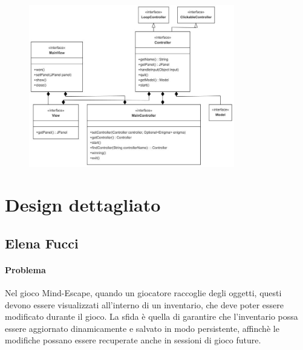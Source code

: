 \documentclass[a4paper,12pt]{report}
\begin{document}
\begin{figure}[h]  %
    \centering
    \includegraphics[width=0.8\textwidth]{img/mvc.png}  %
    \label{img:mvc}
\end{figure}

\section{Design dettagliato}
\subsection{Elena Fucci}
%
\paragraph{Problema}Nel gioco Mind-Escape, quando un giocatore raccoglie degli oggetti, questi devono essere visualizzati all'interno di un inventario, che deve poter essere modificato durante il gioco.
La sfida è quella di garantire che l'inventario possa essere aggiornato dinamicamente e salvato in modo persistente, affinchè le modifiche possano essere recuperate anche in sessioni di gioco future. %
\end{document}
